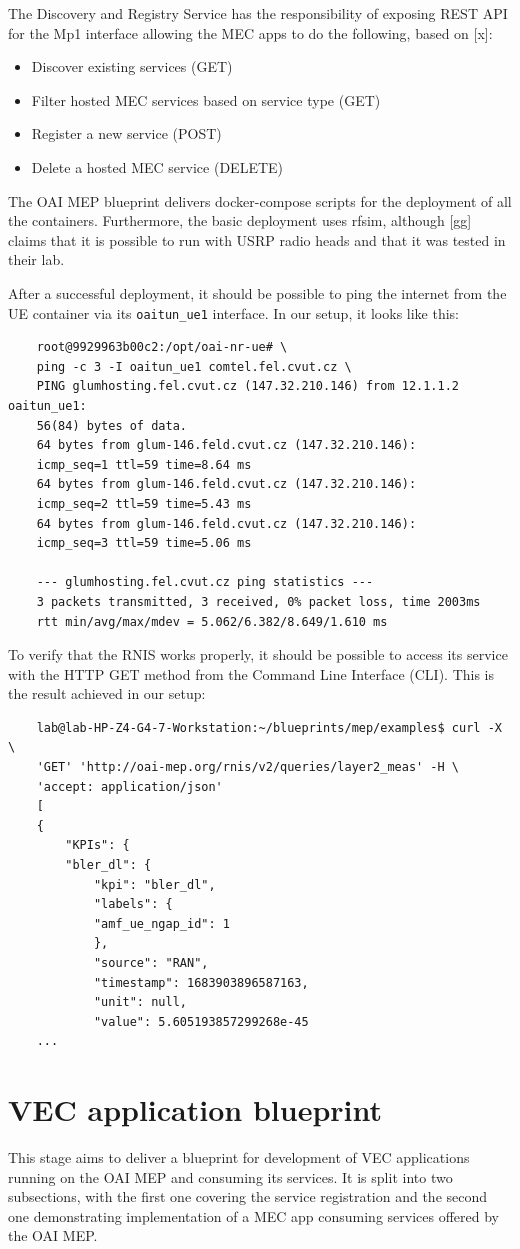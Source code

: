 \documentclass[12pt,a4paper,twoside]{report}
\begin{document}
The Discovery and Registry Service has the responsibility of exposing REST API for the Mp1 interface allowing the MEC apps to do the following, based on [x]:
\begin{itemize}
	\item Discover existing services (GET)
	\item Filter hosted MEC services based on service type (GET)
	\item Register a new service (POST)
	\item Delete a hosted MEC service (DELETE)
\end{itemize}
The OAI MEP blueprint delivers docker-compose scripts for the deployment of all the containers. Furthermore, the basic deployment uses rfsim, although [gg] claims that it is possible to run with USRP radio heads and that it was tested in their lab. 

After a successful deployment, it should be possible to ping the internet from the UE container via its \verb |oaitun_ue1| interface. In our setup, it looks like this:
\begin{verbatim}
	root@9929963b00c2:/opt/oai-nr-ue# \
	ping -c 3 -I oaitun_ue1 comtel.fel.cvut.cz \
	PING glumhosting.fel.cvut.cz (147.32.210.146) from 12.1.1.2 oaitun_ue1:
	56(84) bytes of data.
	64 bytes from glum-146.feld.cvut.cz (147.32.210.146):
	icmp_seq=1 ttl=59 time=8.64 ms
	64 bytes from glum-146.feld.cvut.cz (147.32.210.146):
	icmp_seq=2 ttl=59 time=5.43 ms
	64 bytes from glum-146.feld.cvut.cz (147.32.210.146):
	icmp_seq=3 ttl=59 time=5.06 ms

	--- glumhosting.fel.cvut.cz ping statistics ---
	3 packets transmitted, 3 received, 0% packet loss, time 2003ms
	rtt min/avg/max/mdev = 5.062/6.382/8.649/1.610 ms
\end{verbatim}

To verify that the RNIS works properly, it should be possible to access its service with the HTTP GET method from the Command Line Interface (CLI). This is the result achieved in our setup:
\begin{verbatim}
	lab@lab-HP-Z4-G4-7-Workstation:~/blueprints/mep/examples$ curl -X \
	'GET' 'http://oai-mep.org/rnis/v2/queries/layer2_meas' -H \
	'accept: application/json'
	[
	{
		"KPIs": {
		"bler_dl": {
			"kpi": "bler_dl",
			"labels": {
			"amf_ue_ngap_id": 1
			},
			"source": "RAN",
			"timestamp": 1683903896587163,
			"unit": null,
			"value": 5.605193857299268e-45
	...
\end{verbatim}

\section{VEC application blueprint}
This stage aims to deliver a blueprint for development of VEC applications running on the OAI MEP and consuming its services. It is split into two subsections, with the first one covering the service registration and the second one demonstrating implementation of a MEC app consuming services offered by the OAI MEP.
\end{document}
